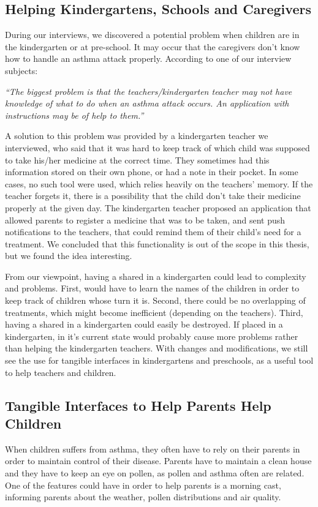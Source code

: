 \subsection{Helping Kindergartens, Schools and Caregivers}
During our interviews, we discovered a potential problem when children are in the kindergarten or at pre-school. It may occur that the caregivers don't know how to handle an asthma attack properly. According to one of our interview subjects: 

\textit{``The biggest problem is that the teachers/kindergarten teacher may not have knowledge of what to do when an asthma attack occurs. An application with instructions may be of help to them.''}

A solution to this problem was provided by a kindergarten teacher we interviewed, who said that it was hard to keep track of which child was supposed to take his/her medicine at the correct time. They sometimes had this information stored on their own phone, or had a note in their pocket. In some cases, no such tool were used, which relies heavily on the teachers' memory. If the teacher forgets it, there is a possibility that the child don't take their medicine properly at the given day. 
The kindergarten teacher proposed an application that allowed parents to register a medicine that was to be taken, and sent push notifications to the teachers, that could remind them of their child's need for a treatment. We concluded that this functionality is out of the scope in this thesis, but we found the idea interesting.         

From our viewpoint, having a shared \buddy{} in a kindergarten could lead to complexity and problems. First, \buddy{} would have to learn the names of the children in order to keep track of children whose turn it is. Second, there could be no overlapping of treatments, which might become inefficient (depending on the teachers). Third, having a shared \buddy{} in a kindergarten could easily be destroyed. If placed in a kindergarten, \buddy{} in it's current state would probably cause more problems rather than helping the kindergarten teachers. With changes and modifications, we still see the use for tangible interfaces in kindergartens and preschools, as a useful tool to help teachers and children.    



\subsection{Tangible Interfaces to Help Parents Help Children}
When children suffers from asthma, they often have to rely on their parents in order to maintain control of their disease. Parents have to maintain a clean house and they have to keep an eye on pollen, as pollen and asthma often are related. One of the features \buddy{} could have in order to help parents is a morning cast, informing parents about the weather, pollen distributions and air quality. 

